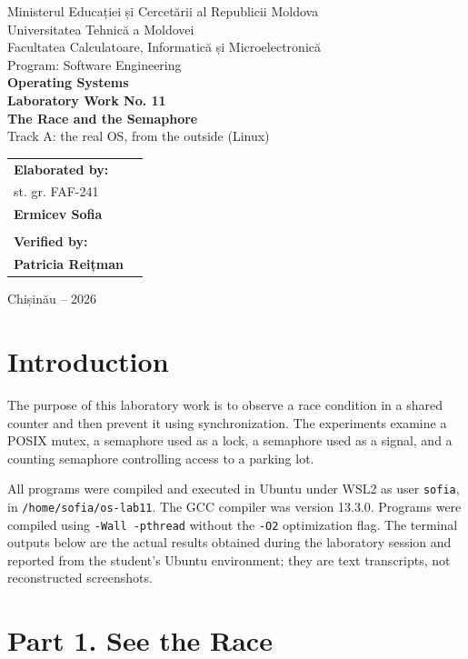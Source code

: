 \documentclass[12pt,a4paper]{article}
\begin{document}
\begin{titlepage}
\begin{center}
{\large Ministerul Educației și Cercetării al Republicii Moldova}\\[0.3cm]
{\large Universitatea Tehnică a Moldovei}\\[0.3cm]
{\large Facultatea Calculatoare, Informatică și Microelectronică}\\[0.3cm]
{\large Program: Software Engineering}\\[2.3cm]
{\Large\textbf{Operating Systems}}\\[0.8cm]
{\LARGE\textbf{Laboratory Work No. 11}}\\[0.5cm]
{\Large\textbf{The Race and the Semaphore}}\\[0.35cm]
{\large Track A: the real OS, from the outside (Linux)}
\vfill
\begin{flushright}
\begin{tabular}{ll}
\textbf{Elaborated by:} & \\
st. gr. FAF-241 & \\
\textbf{Ermicev Sofia} & \\
\\
\textbf{Verified by:} & \\
\textbf{Patricia Reițman} &
\end{tabular}
\end{flushright}
\vfill
{\large Chișinău -- 2026}
\end{center}
\end{titlepage}
\tableofcontents
\newpage
\section{Introduction}
The purpose of this laboratory work is to observe a race condition in a shared counter and then prevent it using synchronization. The experiments examine a POSIX mutex, a semaphore used as a lock, a semaphore used as a signal, and a counting semaphore controlling access to a parking lot.

All programs were compiled and executed in Ubuntu under WSL2 as user \texttt{sofia}, in \texttt{/home/sofia/os-lab11}. The GCC compiler was version 13.3.0. Programs were compiled using \texttt{-Wall -pthread} without the \texttt{-O2} optimization flag. The terminal outputs below are the actual results obtained during the laboratory session and reported from the student's Ubuntu environment; they are text transcripts, not reconstructed screenshots.

\section{Part 1. See the Race}
\end{document}
